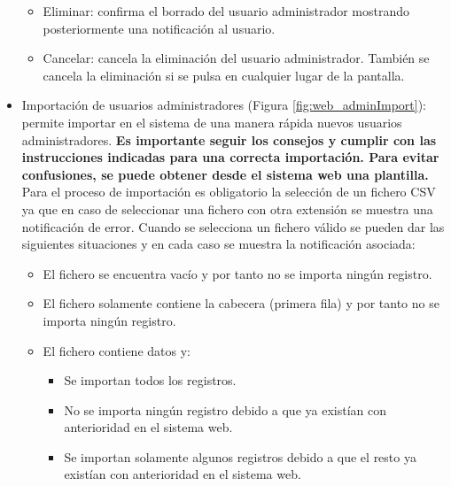 \documentclass[12pt,a4paper, twoside]{report}
\begin{document}
\begin{itemize}
			\begin{itemize}
				\item Eliminar: confirma el borrado del usuario administrador mostrando posteriormente una notificación al usuario.
				\item Cancelar: cancela la eliminación del usuario administrador. También se cancela la eliminación si se pulsa en cualquier lugar de la pantalla.
			\end{itemize}
			
		
		\item Importación de usuarios administradores (Figura \ref{fig:web_adminImport}): permite importar en el sistema de una manera rápida nuevos usuarios administradores. \textbf{Es importante seguir los consejos y cumplir con las instrucciones indicadas para una correcta importación. Para evitar confusiones, se puede obtener desde el sistema web una plantilla.} Para el proceso de importación es obligatorio la selección de un fichero CSV ya que en caso de seleccionar una fichero con otra extensión se muestra una notificación de error. Cuando se selecciona un fichero válido se pueden dar las siguientes situaciones y en cada caso se muestra la notificación asociada: 
		
			\begin{itemize}
				\item El fichero se encuentra vacío y por tanto no se importa ningún registro.
				\item El fichero solamente contiene la cabecera (primera fila) y por tanto no se importa ningún registro.
				\item El fichero contiene datos y:
			
				\begin{itemize}
					\item Se importan todos los registros.
					\item No se importa ningún registro debido a que ya existían con anterioridad en el sistema web. 
					\item Se importan solamente algunos registros debido a que el resto ya existían con anterioridad en el sistema web.
				\end{itemize}
				

\end{itemize}
\end{itemize}
\end{document}
